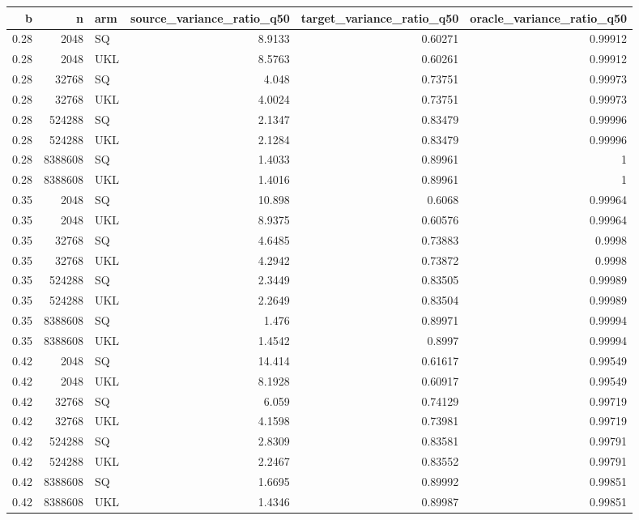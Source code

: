 \begin{tabular}{rrlrrr}
\toprule
b & n & arm & source_variance_ratio_q50 & target_variance_ratio_q50 & oracle_variance_ratio_q50 \\
\midrule
0.28 & 2048 & SQ & 8.9133 & 0.60271 & 0.99912 \\
0.28 & 2048 & UKL & 8.5763 & 0.60261 & 0.99912 \\
0.28 & 32768 & SQ & 4.048 & 0.73751 & 0.99973 \\
0.28 & 32768 & UKL & 4.0024 & 0.73751 & 0.99973 \\
0.28 & 524288 & SQ & 2.1347 & 0.83479 & 0.99996 \\
0.28 & 524288 & UKL & 2.1284 & 0.83479 & 0.99996 \\
0.28 & 8388608 & SQ & 1.4033 & 0.89961 & 1 \\
0.28 & 8388608 & UKL & 1.4016 & 0.89961 & 1 \\
0.35 & 2048 & SQ & 10.898 & 0.6068 & 0.99964 \\
0.35 & 2048 & UKL & 8.9375 & 0.60576 & 0.99964 \\
0.35 & 32768 & SQ & 4.6485 & 0.73883 & 0.9998 \\
0.35 & 32768 & UKL & 4.2942 & 0.73872 & 0.9998 \\
0.35 & 524288 & SQ & 2.3449 & 0.83505 & 0.99989 \\
0.35 & 524288 & UKL & 2.2649 & 0.83504 & 0.99989 \\
0.35 & 8388608 & SQ & 1.476 & 0.89971 & 0.99994 \\
0.35 & 8388608 & UKL & 1.4542 & 0.8997 & 0.99994 \\
0.42 & 2048 & SQ & 14.414 & 0.61617 & 0.99549 \\
0.42 & 2048 & UKL & 8.1928 & 0.60917 & 0.99549 \\
0.42 & 32768 & SQ & 6.059 & 0.74129 & 0.99719 \\
0.42 & 32768 & UKL & 4.1598 & 0.73981 & 0.99719 \\
0.42 & 524288 & SQ & 2.8309 & 0.83581 & 0.99791 \\
0.42 & 524288 & UKL & 2.2467 & 0.83552 & 0.99791 \\
0.42 & 8388608 & SQ & 1.6695 & 0.89992 & 0.99851 \\
0.42 & 8388608 & UKL & 1.4346 & 0.89987 & 0.99851 \\
\bottomrule
\end{tabular}
